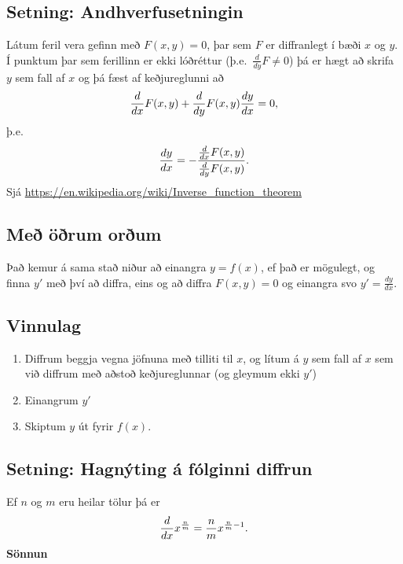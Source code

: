 \documentclass[a4paper,10pt,icelandic]{sphinxmanual}
\begin{document}
\subsection{Setning: Andhverfusetningin}
\label{kafli03:setning-andhverfusetningin}
Látum feril vera gefinn með \(F(x,y) =0\), þar sem \(F\) er
diffranlegt í bæði \(x\) og \(y\). Í punktum þar sem ferillinn
er ekki lóðréttur (þ.e. \(\frac{d}{dy}F \neq 0\)) þá er hægt að
skrifa \(y\) sem fall af \(x\) og þá fæst af keðjureglunni að
\begin{gather}
\begin{split}\frac{d}{dx} F(x,y) + \frac{d}{dy}F(x,y) \frac{dy}{dx} = 0,\end{split}\notag
\end{gather}
þ.e.
\begin{gather}
\begin{split}\frac{dy}{dx} = -\frac{\frac{d}{dx} F(x,y)}{\frac{d}{dy} F(x,y)}.\end{split}\notag
\end{gather}
Sjá \href{https://en.wikipedia.org/wiki/Inverse\_function\_theorem}{https://en.wikipedia.org/wiki/Inverse\_function\_theorem}


\subsection{Með öðrum orðum}
\label{kafli03:me-orum-orum}
Það kemur á sama stað niður að einangra \(y=f(x)\), ef það er
mögulegt, og finna \(y'\) með því að diffra, eins og að diffra
\(F(x,y)=0\) og einangra svo \(y'=\frac{dy}{dx}\).


\subsection{Vinnulag}
\label{kafli03:vinnulag}\begin{enumerate}
\item {} 
Diffrum beggja vegna jöfnuna með tilliti til \(x\), og lítum á
\(y\) sem fall af \(x\) sem við diffrum með aðstoð
keðjureglunnar (og gleymum ekki \(y'\))

\item {} 
Einangrum \(y'\)

\item {} 
Skiptum \(y\) út fyrir \(f(x)\).

\end{enumerate}


\subsection{Setning: Hagnýting á fólginni diffrun}
\label{kafli03:setning-hagnyting-a-folginni-diffrun}
Ef \(n\) og \(m\) eru heilar tölur þá er
\begin{gather}
\begin{split}\frac{d}{dx} x^{\frac nm} = \frac nm x^{\frac nm -1}.\end{split}\notag
\end{gather}
\textbf{Sönnun}
\end{document}
